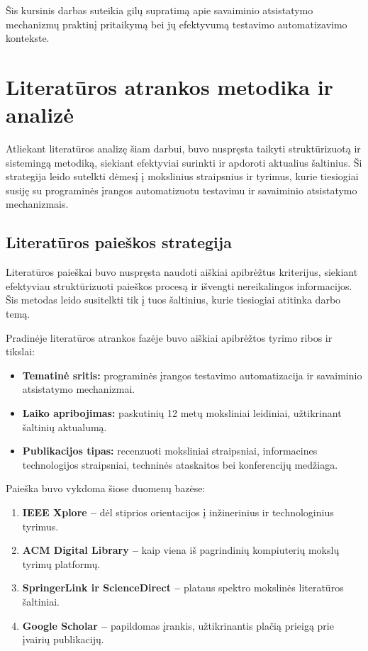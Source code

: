 \documentclass[
]{VUMIFPSkursinis}
\begin{document}
Šis kursinis darbas suteikia gilų supratimą apie savaiminio atsistatymo mechanizmų praktinį pritaikymą bei jų efektyvumą testavimo automatizavimo kontekste.

\section{Literatūros atrankos metodika ir analizė}

Atliekant literatūros analizę šiam darbui, buvo nuspręsta taikyti struktūrizuotą ir sistemingą metodiką, siekiant efektyviai surinkti ir apdoroti aktualius šaltinius. Ši strategija leido sutelkti dėmesį į mokslinius straipsnius ir tyrimus, kurie tiesiogiai susiję su programinės įrangos automatizuotu testavimu ir savaiminio atsistatymo mechanizmais.

\subsection{Literatūros paieškos strategija}

Literatūros paieškai buvo nuspręsta naudoti aiškiai apibrėžtus kriterijus, siekiant efektyviau struktūrizuoti paieškos procesą ir išvengti nereikalingos informacijos. Šis metodas leido susitelkti tik į tuos šaltinius, kurie tiesiogiai atitinka darbo temą.

Pradinėje literatūros atrankos fazėje buvo aiškiai apibrėžtos tyrimo ribos ir tikslai:

\begin{itemize}
    \item \textbf{Tematinė sritis:} programinės įrangos testavimo automatizacija ir savaiminio atsistatymo mechanizmai.
    \item \textbf{Laiko apribojimas:} paskutinių 12 metų moksliniai leidiniai, užtikrinant šaltinių aktualumą.
    \item \textbf{Publikacijos tipas:} recenzuoti moksliniai straipsniai, informacines technologijos straipsniai, techninės ataskaitos bei konferencijų medžiaga.
\end{itemize}

Paieška buvo vykdoma šiose duomenų bazėse:

\begin{enumerate}
    \item \textbf{IEEE Xplore –} dėl stiprios orientacijos į inžinerinius ir technologinius tyrimus.
    \item \textbf{ACM Digital Library –} kaip viena iš pagrindinių kompiuterių mokslų tyrimų platformų.
    \item \textbf{SpringerLink ir ScienceDirect – } plataus spektro mokslinės literatūros šaltiniai.
    \item \textbf{Google Scholar –} papildomas įrankis, užtikrinantis plačią prieigą prie įvairių publikacijų.
\end{enumerate}
\end{document}
